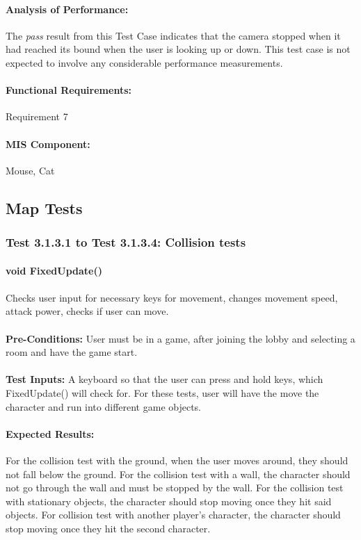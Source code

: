 \documentclass{article}
\begin{document}
    \paragraph{Analysis of Performance:} The \emph{pass} result from this Test Case indicates that the camera stopped when it had reached its bound when the user is looking up or down. This test case is not expected to involve any considerable performance measurements.
    \paragraph{Functional Requirements:} Requirement 7
    \paragraph{MIS Component:} Mouse, Cat
    
    \subsection{Map Tests}
    \subsubsection{Test 3.1.3.1 to Test 3.1.3.4: Collision tests}
    \paragraph{}\textbf{void FixedUpdate()}
    \paragraph{} Checks user input for necessary keys for movement, changes movement speed, attack power, checks if user can move.
    \paragraph{}\textbf{Pre-Conditions:} User must be in a game, after joining the lobby and selecting a room and have the game start.
    \paragraph{}\textbf{Test Inputs:} A keyboard so that the user can press and hold keys, which FixedUpdate() will check for. For these tests, user will have the move the character and run into different game objects. 
    \paragraph{Expected Results:} For the collision test with the ground, when the user moves around, they should not fall below the ground. For the collision test with a wall, the character should not go through the wall and must be stopped by the wall. For the collision test with stationary objects, the character should stop moving once they hit said objects. For collision test with another player's character, the character should stop moving once they hit the second character. 
\end{document}
